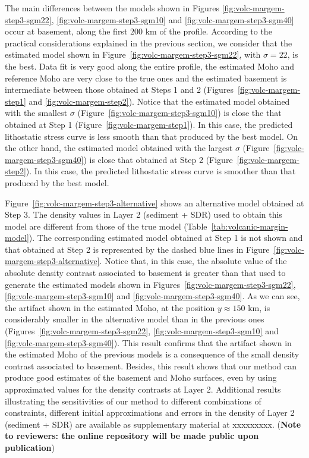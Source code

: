 \documentclass[manuscript]{geophysics}
\begin{document}
The main differences between the models shown in 
Figures \ref{fig:volc-margem-step3-sgm22}, \ref{fig:volc-margem-step3-sgm10} and 
\ref{fig:volc-margem-step3-sgm40} occur at basement,
along the first $200$ km of the profile.
According to the practical considerations explained in the previous section, 
we consider that the estimated model shown in Figure~\ref{fig:volc-margem-step3-sgm22},
with $\sigma = 22$, is the best. 
Data fit is very good along the entire profile, the estimated Moho and
reference Moho are very close to the true ones and the estimated basement is intermediate
between those obtained at Steps 1 and 2 (Figures~\ref{fig:volc-margem-step1} and
\ref{fig:volc-margem-step2}).
Notice that the estimated model obtained with 
the smallest $\sigma$ (Figure~\ref{fig:volc-margem-step3-sgm10}) is close the that 
obtained at Step 1 (Figure~\ref{fig:volc-margem-step1}).
In this case, the predicted lithostatic stress curve is less smooth than that
produced by the best model.
On the other hand, the estimated model obtained with 
the largest $\sigma$ (Figure~\ref{fig:volc-margem-step3-sgm40}) is close that 
obtained at Step 2 (Figure~\ref{fig:volc-margem-step2}).
In this case, the predicted lithostatic stress curve is smoother than that
produced by the best model.

Figure~\ref{fig:volc-margem-step3-alternative} shows an alternative 
model obtained at Step 3.
The density values in Layer 2 (sediment + SDR) used to obtain this model 
are different from those of the true model (Table~\ref{tab:volcanic-margin-model}).
The corresponding estimated model obtained at Step 1 is not shown and
that obtained at Step 2 is represented by the dashed blue lines in
Figure~\ref{fig:volc-margem-step3-alternative}.
Notice that, in this case, the absolute value of the absolute density contrast associated to basement 
is greater than that used to generate the estimated models shown in 
Figures~\ref{fig:volc-margem-step3-sgm22}, \ref{fig:volc-margem-step3-sgm10} and
\ref{fig:volc-margem-step3-sgm40}. As we can see, the artifact shown in the estimated Moho,
at the position $y \approx 150$ km, is considerably smaller in the alternative model than
in the previous ones (Figures~\ref{fig:volc-margem-step3-sgm22}, \ref{fig:volc-margem-step3-sgm10} and
\ref{fig:volc-margem-step3-sgm40}). This result confirms that the artifact shown in the
estimated Moho of the previous models is a consequence of the small density contrast
associated to basement.
Besides, this result shows that our method can produce good estimates of the basement and
Moho surfaces, even by using approximated values for the density contrasts at Layer 2.
Additional results illustrating the sensitivities of our method to different combinations 
of constraints, different initial approximations and errors in the density of Layer 2 
(sediment + SDR) are available as supplementary material at xxxxxxxxx.
(\textbf{Note to reviewers: the online repository 
will be made public upon
publication})
\end{document}
